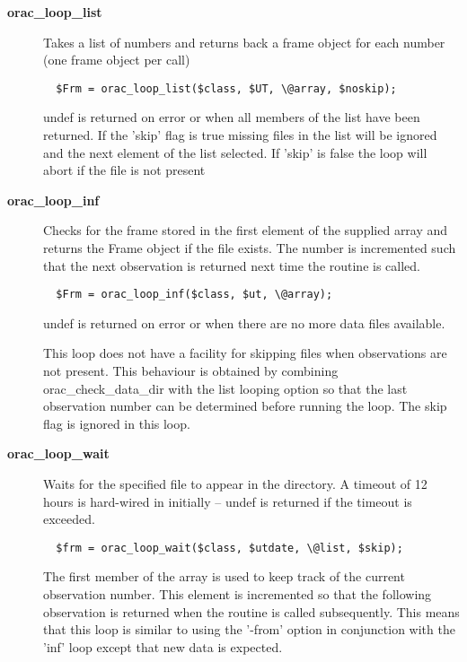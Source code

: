 \begin{description}

\item[\textbf{orac\_loop\_list}] \mbox{}

Takes a list of numbers and returns back a frame object 
for each number (one frame object per call)

\begin{verbatim}
  $Frm = orac_loop_list($class, $UT, \@array, $noskip);
\end{verbatim}


undef is returned on error or when all members of the
list have been returned. If the 'skip' flag is true
missing files in the list will be ignored and the next
element of the list selected. If 'skip' is false
the loop will abort if the file is not present


\item[\textbf{orac\_loop\_inf}] \mbox{}

Checks for the frame stored in the first element of the supplied array
and returns the Frame object if the file exists. The number is incremented
such that the next observation is returned next time the routine is
called.

\begin{verbatim}
  $Frm = orac_loop_inf($class, $ut, \@array);
\end{verbatim}


undef is returned on error or when there are no more data files
available.



This loop does not have a facility for skipping files when observations
are not present. This behaviour is obtained by combining 
orac\_check\_data\_dir with the list looping option so that the last
observation number can be determined before running the loop. The skip
flag is ignored in this loop.


\item[\textbf{orac\_loop\_wait}] \mbox{}

Waits for the specified file to appear in the directory.
A timeout of 12 hours is hard-wired in initially -- undef
is returned if the timeout is exceeded.

\begin{verbatim}
  $frm = orac_loop_wait($class, $utdate, \@list, $skip);
\end{verbatim}


The first member of the array is used to keep track of the
current observation number. This element is incremented so that
the following observation is returned when the routine is called
subsequently. This means that this loop is similar to using the
'-from' option in conjunction with the 'inf' loop except that
new data is expected.




\end{description}
